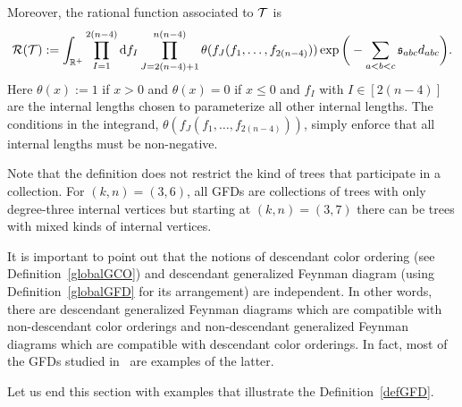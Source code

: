 \documentclass[pdftex]{sigma}
\def \s {\sigma}
\theoremstyle{definition}
\def \be {\begin{equation}}
\def \ee {\end{equation}}
\def \be {\begin{equation}}
\def \s {\mathfrak{s}}
\numberwithin{equation}{section}
\begin{document}
Moreover, the rational function associated to ${\cal T}$ is
\be\label{Scw3}
{\cal R}({\cal T}) := \int_{\mathbb{R}^+} \prod_{I=1}^{2(n-4)}{\rm d}f_I \prod_{J=2(n-4)+1}^{n(n-4)}\theta (f_J(f_1,\dots ,f_{2(n-4)})) \exp \bigg(-\sum_{a<b<c}\s_{abc}  d_{abc}\bigg).
\ee
Here $\theta(x):=1$ if $x > 0$ and $\theta(x)=0$ if $x\leq 0$ and $f_I$ with $I\in [2(n-4)]$ are the internal lengths chosen to parameterize all other internal lengths. The conditions in the integrand, $\theta (f_J(f_1,\dots ,f_{2(n-4)}))$, simply enforce that all internal lengths must be non-negative.

Note that the definition does not restrict the kind of trees that participate in a collection. For $(k,n)=(3,6)$, all GFDs are collections of trees with only degree-three internal vertices but starting at $(k,n)=(3,7)$ there can be trees with mixed kinds of internal vertices.

It is important to point out that the notions of descendant color ordering (see Definition~\ref{globalGCO}) and descendant generalized Feynman diagram (using Definition~\ref{globalGFD} for its arrangement) are independent. In other words, there are descendant generalized Feynman diagrams which are compatible with non-descendant color orderings and non-descendant generalized Feynman diagrams which are compatible with descendant color orderings. In fact, most of the GFDs studied in~\cite{Borges:2019csl} are examples of the latter.

Let us end this section with examples that illustrate the Definition~\ref{defGFD}.
\end{document}
